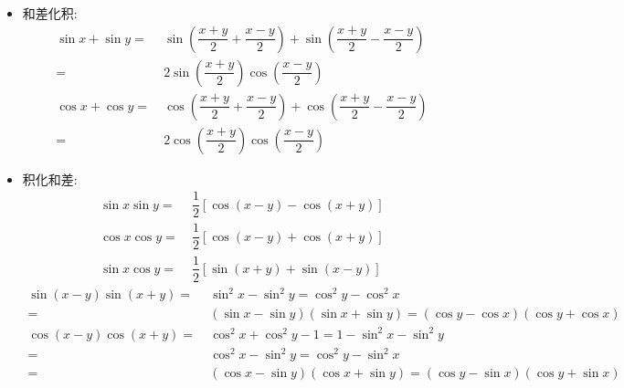 \begin{itemize}[leftmargin=\inteval{\myitemleftmargin}pt,itemsep=
   \inteval{\myitemitempsep}pt,topsep=\inteval{\myitemtopsep}pt]
\item 和差化积:
\begin{align*}
\sin x+\sin y=&\  \sin \left(\dfrac{x+y}{2} +\dfrac{x-y}{2} \right) +\sin \left(\dfrac{x+y}{2}-\dfrac{x-y}{2} \right)\\
=&\  2\sin \left(\dfrac{x+y}{2}\right) \cos\left(\dfrac{x-y}{2}\right) \\ 
\cos x+\cos y=&\  \cos \left(\dfrac{x+y}{2} +\dfrac{x-y}{2} \right) +\cos \left(\dfrac{x+y}{2}-\dfrac{x-y}{2} \right)\\
=&\  2\cos \left(\dfrac{x+y}{2}\right) \cos  \left(\dfrac{x-y}{2}\right)	
\end{align*}
\item 积化和差:
\begin{align*}
\sin x\sin y=&\ \dfrac{1}{2}[\cos(x-y)-\cos(x+y)] \\
\cos x\cos y=&\ \dfrac{1}{2}[\cos(x-y)+\cos(x+y)] \\	
\sin x\cos y=&\ \dfrac{1}{2}[\sin(x+y)+\sin(x-y)] 
\end{align*}
\begin{align*}
\sin(x-y)\sin(x+y) =&\ \sin^2 x-\sin^2y=\cos^2 y-\cos^2 x \\
=&\ (\sin x-\sin y)(\sin x+\sin y)=(\cos y-\cos x)(\cos y+\cos x) \\
\cos(x-y)\cos(x+y) =&\ \cos^2 x+\cos^2 y-1=1-\sin^2 x-\sin^2 y \\
=&\ \cos^2 x-\sin^2 y=\cos^2 y-\sin^2 x \\
=&\ (\cos x-\sin y)(\cos x+\sin y)=(\cos y-\sin x)(\cos y+\sin x)
\end{align*}


\end{itemize}
